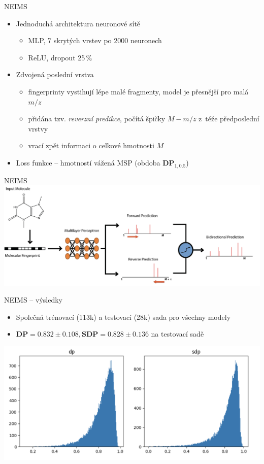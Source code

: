 \documentclass[aspectratio=169]{beamer}
\begin{document}
\begin{frame}
{NEIMS}
\begin{itemize}
\item Jednoduchá architektura neuronové sítě
\begin{itemize}
\item MLP, 7 skrytých vrstev po 2000 neuronech
\item ReLU, dropout 25\,\%
\end{itemize}
\item Zdvojená poslední vrstva
\begin{itemize}
\item fingerprinty vystihují lépe malé fragmenty, model je přesnější pro malá $m/z$
\item přidána tzv. \emph{reverzní predikce}, počítá špičky $M-m/z$ z~téže předposlední vrstvy
\item vrací zpět informaci o celkové hmotnosti $M$
\end{itemize}
\item Loss funkce -- hmotností vážená MSP (obdoba $\textbf{DP}_{1,0.5}$)
\end{itemize}
\end{frame}

\begin{frame}
{NEIMS}
\includegraphics[width=\hsize]{neims.png}
\end{frame}

\begin{frame}
{NEIMS -- výsledky}
\begin{itemize}
\item Společná trénovací (113k) a testovací (28k) sada pro všechny modely 
\item $\textbf{DP} = 0.832\pm0.108, \textbf{SDP}=0.828\pm 0.136$ na testovací sadě
\end{itemize}
\includegraphics[width=.6\hsize]{neims-hist}
\end{frame}
\end{document}
